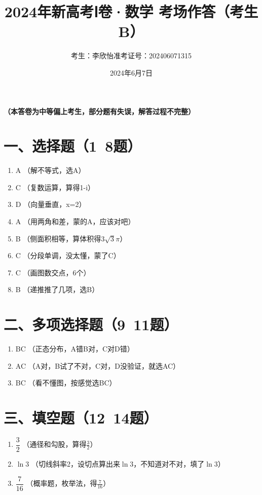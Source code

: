 \documentclass[12pt,a4paper]{article}
\title{2024年新高考Ⅰ卷·数学 考场作答（考生B）}
\author{考生：李欣怡\quad 准考证号：202406071315}
\date{2024年6月7日}
\begin{document}
\maketitle
\begin{center}
{\large \textbf{（本答卷为中等偏上考生，部分题有失误，解答过程不完整）}}
\end{center}

\section*{一、选择题（1~8题）}
\begin{enumerate}[label=\arabic*.]
\item A \quad （解不等式，选A）
\item C \quad （复数运算，算得1-i）
\item D \quad （向量垂直，x=2）
\item A \quad （用两角和差，蒙的A，应该对吧）
\item B \quad （侧面积相等，算体积得$3\sqrt3\pi$）
\item C \quad （分段单调，没太懂，蒙了C）
\item C \quad （画图数交点，6个）
\item B \quad （递推推了几项，选B）
\end{enumerate}

\section*{二、多项选择题（9~11题）}
\begin{enumerate}[label=\arabic*.]
\item BC \quad （正态分布，A错B对，C对D错）
\item AC \quad （A对，B试了不对，C对，D没验证，就选AC）
\item BC \quad （看不懂图，按感觉选BC）
\end{enumerate}

\section*{三、填空题（12~14题）}
\begin{enumerate}[label=\arabic*.]
\item $\dfrac{3}{2}$ \quad （通径和勾股，算得$\frac32$）
\item $\ln 3$ \quad （切线斜率2，设切点算出来$\ln3$，不知道对不对，填了$\ln3$）
\item $\dfrac{7}{16}$ \quad （概率题，枚举法，得$\frac{7}{16}$）
\end{enumerate}
\end{document}
